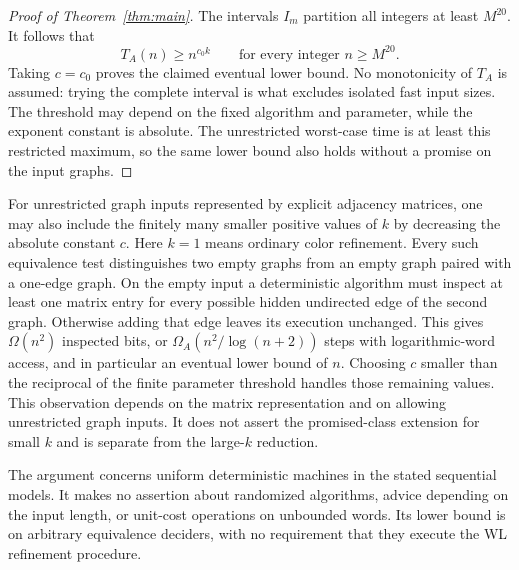 \begin{proof}[Proof of Theorem~\ref{thm:main}]
The intervals $I_m$ partition all integers at least $M^{20}$. It follows
that
\[
  T_A(n)\ge n^{c_0 k}
  \qquad\text{for every integer }n\ge M^{20}.
\]
Taking $c=c_0$ proves the claimed eventual lower bound. No monotonicity of
$T_A$ is assumed: trying the complete interval is what excludes isolated
fast input sizes. The threshold may depend on the fixed algorithm and
parameter, while the exponent constant is absolute.
The unrestricted worst-case time is at least this restricted maximum, so
the same lower bound also holds without a promise on the input graphs.
\end{proof}

\begin{remark}
\label{trans:small-parameters}
For unrestricted graph inputs represented by explicit adjacency matrices,
one may also include the finitely many smaller positive values of $k$ by
decreasing the absolute constant $c$. Here $k=1$ means ordinary color
refinement. Every such equivalence
test distinguishes two empty graphs from an empty graph paired with a
one-edge graph. On the empty input a deterministic algorithm must inspect
at least one matrix entry for every possible hidden undirected edge of
the second graph. Otherwise adding that edge leaves its execution
unchanged. This gives $\Omega(n^2)$ inspected bits, or
$\Omega_A(n^2/\log(n+2))$ steps with logarithmic-word access, and in
particular an eventual lower bound of $n$. Choosing $c$ smaller than the
reciprocal of the finite parameter threshold handles those remaining
values. This observation depends on the matrix representation and on
allowing unrestricted graph inputs. It does not assert the promised-class
extension for small $k$ and is separate from the large-$k$ reduction.
\end{remark}

The argument concerns uniform deterministic machines in the stated
sequential models. It makes no assertion about randomized algorithms,
advice depending on the input length, or unit-cost operations on unbounded
words. Its lower bound is on arbitrary equivalence deciders, with no
requirement that they execute the WL refinement procedure.
